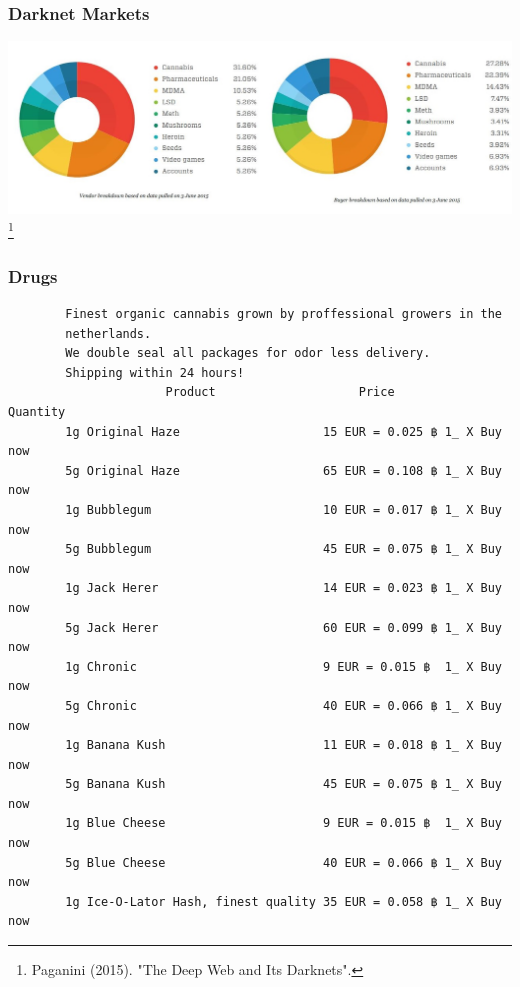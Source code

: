 \documentclass[t,xcolor={svgnames,table},aspectratio=169]{beamer}
\begin{document}
\begin{frame}
	\frametitle{Darknet Markets}
	
	\includegraphics[trim={0 2cm 16cm 1cm},clip,width=\pagewidth]{DeepWeb-Black-markets-vendors-buyers.jpg}\footnote{Paganini (2015). "The Deep Web and Its Darknets".}
\end{frame}

\begin{frame}[fragile]
	\frametitle{Drugs}
	
	\color{OwlGreen}
	\large
	\begin{verbatim}
		Finest organic cannabis grown by proffessional growers in the
		netherlands.
		We double seal all packages for odor less delivery.
		Shipping within 24 hours!
		              Product                    Price          Quantity
		1g Original Haze                    15 EUR = 0.025 ฿ 1_ X Buy now
		5g Original Haze                    65 EUR = 0.108 ฿ 1_ X Buy now
		1g Bubblegum                        10 EUR = 0.017 ฿ 1_ X Buy now
		5g Bubblegum                        45 EUR = 0.075 ฿ 1_ X Buy now
		1g Jack Herer                       14 EUR = 0.023 ฿ 1_ X Buy now
		5g Jack Herer                       60 EUR = 0.099 ฿ 1_ X Buy now
		1g Chronic                          9 EUR = 0.015 ฿  1_ X Buy now
		5g Chronic                          40 EUR = 0.066 ฿ 1_ X Buy now
		1g Banana Kush                      11 EUR = 0.018 ฿ 1_ X Buy now
		5g Banana Kush                      45 EUR = 0.075 ฿ 1_ X Buy now
		1g Blue Cheese                      9 EUR = 0.015 ฿  1_ X Buy now
		5g Blue Cheese                      40 EUR = 0.066 ฿ 1_ X Buy now
		1g Ice-O-Lator Hash, finest quality 35 EUR = 0.058 ฿ 1_ X Buy now
	\end{verbatim}
\end{frame}
\end{document}
